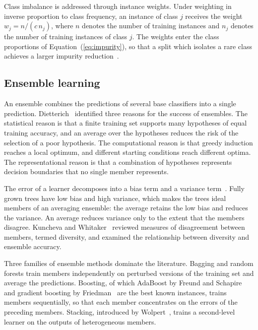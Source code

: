 Class imbalance is addressed through instance weights. Under weighting in
inverse proportion to class frequency, an instance of class $j$ receives the
weight $w_j = n / (c\,n_j)$, where $n$ denotes the number of training
instances and $n_j$ denotes the number of training instances of class $j$.
The weights enter the class proportions of Equation~(\ref{eq:impurity}), so
that a split which isolates a rare class achieves a larger impurity
reduction~\cite{he2009}.

\subsection{Ensemble learning}
\label{sec:bg-ensemble}

An ensemble combines the predictions of several base classifiers into a
single prediction. Dietterich~\cite{dietterich2000} identified three reasons
for the success of ensembles. The statistical reason is that a finite
training set supports many hypotheses of equal training accuracy, and an
average over the hypotheses reduces the risk of the selection of a poor
hypothesis. The computational reason is that greedy induction reaches a
local optimum, and different starting conditions reach different optima. The
representational reason is that a combination of hypotheses represents
decision boundaries that no single member represents.

The error of a learner decomposes into a bias term and a variance
term~\cite{geman1992}. Fully grown trees have low bias and high variance,
which makes the trees ideal members of an averaging ensemble: the average
retains the low bias and reduces the variance. An average reduces variance
only to the extent that the members disagree. Kuncheva and
Whitaker~\cite{kuncheva2003} reviewed measures of disagreement between
members, termed diversity, and examined the relationship between diversity
and ensemble accuracy.

Three families of ensemble methods dominate the literature. Bagging and
random forests train members independently on perturbed versions of the
training set and average the predictions. Boosting, of which AdaBoost by
Freund and Schapire~\cite{freund1997} and gradient boosting by
Friedman~\cite{friedman2001} are the best known instances, trains members
sequentially, so that each member concentrates on the errors of the
preceding members. Stacking, introduced by Wolpert~\cite{wolpert1992}, trains
a second-level learner on the outputs of heterogeneous members.

